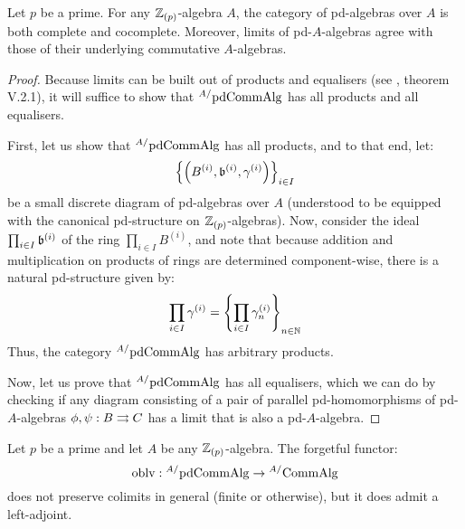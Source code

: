                 \begin{proposition}
                    Let $p$ be a prime. For any $\mathbb{Z}_{(p)}$-algebra $A$, the category of pd-algebras over $A$ is both complete and cocomplete. Moreover, limits of pd-$A$-algebras agree with those of their underlying commutative $A$-algebras.
                \end{proposition}
                    \begin{proof}
                        Because limits can be built out of products and equalisers (see \cite{maclane}, theorem V.2.1), it will suffice to show that ${}^{A/}\mathrm{pd}\mathrm{Comm}\mathrm{Alg}$ has all products and all equalisers.
                        
                        First, let us show that ${}^{A/}\mathrm{pd}\mathrm{Comm}\mathrm{Alg}$ has all products, and to that end, let:
                            $$\left\{\left(B^{(i)}, \mathfrak{b}^{(i)}, \gamma^{(i)}\right)\right\}_{i \in I}$$
                        be a small discrete diagram of pd-algebras over $A$ (understood to be equipped with the canonical pd-structure on $\mathbb{Z}_{(p)}$-algebras). Now, consider the ideal $\prod_{i \in I} \mathfrak{b}^{(i)}$ of the ring $\prod_{i \in I} B^{(i)}$, and note that because addition and multiplication on products of rings are determined component-wise, there is a natural pd-structure given by:
                            $$\prod_{i \in I} \gamma^{(i)} = \left\{\prod_{i \in I} \gamma_n^{(i)}\right\}_{n \in \mathbb{N}}$$
                        Thus, the category ${}^{A/}\mathrm{pd}\mathrm{Comm}\mathrm{Alg}$ has arbitrary products. 
                        
                        Now, let us prove that ${}^{A/}\mathrm{pd}\mathrm{Comm}\mathrm{Alg}$ has all equalisers, which we can do by checking if any diagram consisting of a pair of parallel pd-homomorphisms of pd-$A$-algebras $\phi, \psi: B \rightrightarrows C$ has a limit that is also a pd-$A$-algebra.  
                    \end{proof}
                \begin{corollary} \label{coro: free_pd_algebras}
                    Let $p$ be a prime and let $A$ be any $\mathbb{Z}_{(p)}$-algebra. The forgetful functor:
                        $$\mathrm{oblv}: {}^{A/}\mathrm{pd}\mathrm{Comm}\mathrm{Alg} \to {}^{A/}\mathrm{Comm}\mathrm{Alg}$$
                    does not preserve colimits in general (finite or otherwise), but it does admit a left-adjoint.
                \end{corollary}
